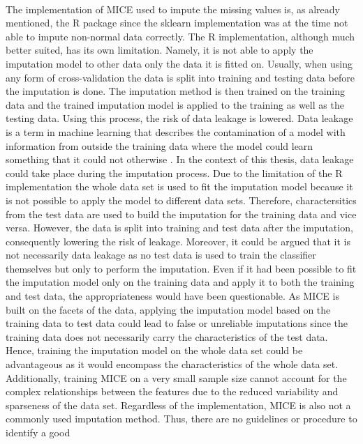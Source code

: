 \\
The implementation of MICE used to impute the missing values is, as already 
mentioned, the R package  since the sklearn implementation was at 
the time not able to impute non-normal data correctly. The R implementation, 
although much better suited, has its own limitation. Namely, it is not able to 
apply the imputation model to other data only the data it is fitted on. 
Usually, when using any form of cross-validation the data is split into 
training and testing data before the imputation is done. The imputation method 
is then trained on the training data and the trained imputation model is 
applied to the training as well as the testing data. Using this process, the 
risk of data leakage is lowered.
Data leakage is a term in machine learning 
that describes the contamination of a model with information from outside the 
training data where the model could learn something that it could not 
otherwise \cite{RN199}.
In the context of this thesis, data leakage could take place during the 
imputation process. Due to the limitation of the R implementation the whole 
data set is used to fit the imputation model because it is not possible to 
apply the model to different data sets. Therefore, charactersitics from the 
test data are used to build the imputation for the training data and vice 
versa. However, the data is split into training and test data after the 
imputation, consequently lowering the risk of leakage. Moreover, it could be 
argued that it is not necessarily data leakage as no test data is used to train 
the classifier themselves but only to perform the imputation.
Even if it had been possible to fit the imputation model only on the training 
data and apply it to both the training and test data, the appropriateness would 
have been questionable. As MICE is built on the facets of the data, applying 
the imputation model based on the training data to test data could lead to 
false or unreliable imputations since the training data does not necessarily 
carry the characteristics of the test data. Hence, training the imputation 
model on the whole data set could be advantageous as it would encompass the 
characteristics of the whole data set. Additionally, training MICE on a very 
small sample size cannot account for the complex relationships between the 
features due to the reduced variability and sparseness of the data set.
Regardless of the implementation, MICE is also not a commonly used imputation 
method. Thus, there are no guidelines or procedure to identify a good 
